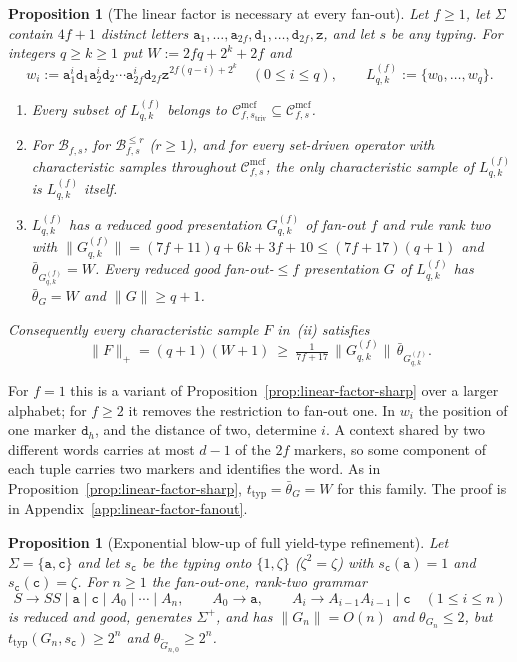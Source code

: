 \documentclass[11pt]{article}
\numberwithin{equation}{section}
\theoremstyle{plain}
\newtheorem{proposition}[theorem]{Proposition}
\theoremstyle{definition}
\theoremstyle{remark}
\newcommand{\Cmcf}[2]{\mathcal{C}^{\mathrm{mcf}}_{#1,#2}}
\begin{document}
\begin{proposition}[The linear factor is necessary at every fan-out]
\label{prop:linear-factor-all-fanout}
Let $f\ge1$, let $\Sigma$ contain $4f+1$ distinct letters
$\mathtt a_1,\ldots,\mathtt a_{2f},\mathtt d_1,\ldots,\mathtt d_{2f},\mathtt z$, and let
$s$ be any typing.  For integers $q\ge k\ge1$ put $W:=2fq+2^k+2f$ and
\[
 w_i:=\mathtt a_1^i\mathtt d_1\mathtt a_2^i\mathtt d_2\cdots\mathtt a_{2f}^i\mathtt d_{2f}
 \mathtt z^{2f(q-i)+2^k}\quad(0\le i\le q),\qquad
 L^{(f)}_{q,k}:=\{w_0,\ldots,w_q\}.
\]
\begin{enumerate}[label=\textup{(\roman*)},leftmargin=*]
\item Every subset of $L^{(f)}_{q,k}$ belongs to
$\Cmcf{f}{s_{\mathrm{triv}}}\subseteq\Cmcf{f}{s}$.
\item For $\mathcal B_{f,s}$, for $\mathcal B^{\le r}_{f,s}$ \textup($r\ge1$\textup),
and for every set-driven operator with characteristic samples throughout
$\Cmcf{f}{s}$, the only characteristic sample of $L^{(f)}_{q,k}$ is
$L^{(f)}_{q,k}$ itself.
\item $L^{(f)}_{q,k}$ has a reduced good presentation $G^{(f)}_{q,k}$ of fan-out
$f$ and rule rank two with
$\|G^{(f)}_{q,k}\|=(7f+11)q+6k+3f+10\le(7f+17)(q+1)$ and
$\bar\theta_{G^{(f)}_{q,k}}=W$.  Every reduced good fan-out-$\le f$ presentation
$G$ of $L^{(f)}_{q,k}$ has $\bar\theta_G=W$ and $\|G\|\ge q+1$.
\end{enumerate}
Consequently every characteristic sample $F$ in~\textup{(ii)} satisfies
\[
 \|F\|_+=(q+1)(W+1)\ \ge\ \tfrac1{7f+17}\,\|G^{(f)}_{q,k}\|\,
 \bar\theta_{G^{(f)}_{q,k}}.
\]
\end{proposition}

For $f=1$ this is a variant of Proposition~\ref{prop:linear-factor-sharp} over a
larger alphabet; for $f\ge2$ it removes the restriction to fan-out one.  In
$w_i$ the position of one marker $\mathtt d_h$, and the distance of two, determine
$i$.  A context shared by two different words carries at most $d-1$ of the $2f$
markers, so some component of each tuple carries two markers and identifies the
word.  As in Proposition~\ref{prop:linear-factor-sharp},
$t_{\mathrm{typ}}=\bar\theta_G=W$ for this family.  The proof is in
Appendix~\ref{app:linear-factor-fanout}.

\begin{proposition}[Exponential blow-up of full yield-type refinement]
\label{prop:typed-thickness-exponential}
Let $\Sigma=\{\mathtt a,\mathtt c\}$ and let $s_{\mathtt c}$ be the typing onto
$\{1,\zeta\}$ ($\zeta^2=\zeta$) with $s_{\mathtt c}(\mathtt a)=1$ and
$s_{\mathtt c}(\mathtt c)=\zeta$.  For $n\ge1$ the fan-out-one, rank-two grammar
\[
 S\to SS\mid\mathtt a\mid\mathtt c\mid A_0\mid\cdots\mid A_n,\qquad
 A_0\to\mathtt a,\qquad
 A_i\to A_{i-1}A_{i-1}\mid\mathtt c\quad(1\le i\le n)
\]
is reduced and good, generates $\Sigma^+$, and has $\|G_n\|=O(n)$ and
$\theta_{G_n}\le2$, but $t_{\mathrm{typ}}(G_n,s_{\mathtt c})\ge2^n$ and
$\theta_{\widetilde G_{n,0}}\ge2^n$.
\end{proposition}
\end{document}
